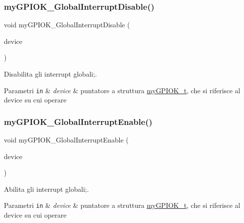 \subsubsection{\texorpdfstring{my\+G\+P\+I\+O\+K\+\_\+\+Global\+Interrupt\+Disable()}{myGPIOK\_GlobalInterruptDisable()}}
{\footnotesize\ttfamily void my\+G\+P\+I\+O\+K\+\_\+\+Global\+Interrupt\+Disable (\begin{DoxyParamCaption}\item[{\hyperlink{structmy_g_p_i_o_k__t}{my\+G\+P\+I\+O\+K\+\_\+t} $\ast$}]{device }\end{DoxyParamCaption})}



Disabilita gli interrupt globali;. 


\begin{DoxyParams}[1]{Parametri}
\mbox{\tt in}  & {\em device} & puntatore a struttura \hyperlink{structmy_g_p_i_o_k__t}{my\+G\+P\+I\+O\+K\+\_\+t}, che si riferisce al device su cui operare \\
\hline
\end{DoxyParams}
\mbox{\label{group___linux-_driver_gaf8da20aabceb02b9ea8132228c973368}} 
\subsubsection{\texorpdfstring{my\+G\+P\+I\+O\+K\+\_\+\+Global\+Interrupt\+Enable()}{myGPIOK\_GlobalInterruptEnable()}}
{\footnotesize\ttfamily void my\+G\+P\+I\+O\+K\+\_\+\+Global\+Interrupt\+Enable (\begin{DoxyParamCaption}\item[{\hyperlink{structmy_g_p_i_o_k__t}{my\+G\+P\+I\+O\+K\+\_\+t} $\ast$}]{device }\end{DoxyParamCaption})}



Abilita gli interrupt globali;. 


\begin{DoxyParams}[1]{Parametri}
\mbox{\tt in}  & {\em device} & puntatore a struttura \hyperlink{structmy_g_p_i_o_k__t}{my\+G\+P\+I\+O\+K\+\_\+t}, che si riferisce al device su cui operare \\
\hline
\end{DoxyParams}
\mbox{\label{group___linux-_driver_ga5a7df448de9de94620ce1baf7ec388c9}} 
